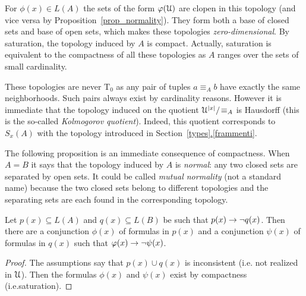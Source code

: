 \documentclass[creche.tex]{subfiles}
\begin{document}
For $\phi(x)\in L(A)$ the sets of the form $\varphi(\EuScript U)$ are clopen in this topology (and vice versa by Proposition~\ref{prop_normality}). They form both a base of closed sets and base of open sets, which makes these topologies \textit{zero-dimensional}. By saturation, the topology induced by $A$ is compact. Actually, saturation is equivalent to the compactness of all these topologies as $A$ ranges over the sets of small cardinality.

These topologies are never T$_0$ as any pair of tuples $a\equiv_A b$ have exactly the same neighborhoods. Such pairs always exist by cardinality reasons. However it is immediate that the topology induced on the quotient $\EuScript U^{|x|}/\!\equiv_A$ is Hausdorff (this is the so-called \textit{Kolmogorov quotient}). Indeed, this quotient corresponds to $S_x(A)$ with the topology introduced in Section~\hyperref[frammenti]{\ref{types}.\ref*{frammenti}}.

The following proposition is an immediate consequence of compactness. When $A=B$ it says that the topology induced by $A$ is \textit{normal}: any two closed sets are separated by open sets. It could be called \emph{mutual normality\/} (not a standard name) because the two closed sets belong to different topologies and the separating sets are each found in the corresponding topology.


\begin{proposition}\label{prop_normality}
Let $p(x)\subseteq L(A)$ and $q(x)\subseteq L(B)$ be such that $p(x)\rightarrow \neg q(x)$.
Then there are a conjunction $\phi(x)$ of formulas in $p(x)$ and a conjunction $\psi(x)$ of formulas in $q(x)$ such that $\varphi(x)\rightarrow\neg\psi(x)$.
\end{proposition}

\begin{proof}
The assumptions say that $p(x)\cup q(x)$ is inconsistent (i.e. not realized in $\EuScript U$). Then the formulas $\phi(x)$ and $\psi(x)$ exist by compactness (i.e.\@ saturation).
\end{proof}
\end{document}
